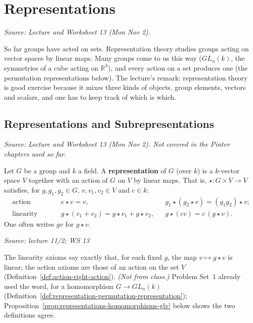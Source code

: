\documentclass[11pt]{report}
\newcommand{\srcline}[1]{\par\hfill{\footnotesize\textit{Source: #1}}}
\begin{document}
\chapter{Representations}\label{ch:representations}

\textit{Source: Lecture and Worksheet 13 (Mon Nov 2).}

So far groups have acted on sets. Representation theory studies groups acting on vector spaces by linear maps. Many groups come to us this way ($GL_n(k)$, the symmetries of a cube acting on $\mathbb{R}^3$), and every action on a set produces one (the permutation representations below). The lecture's remark: representation theory is good exercise because it mixes three kinds of objects, group elements, vectors and scalars, and one has to keep track of which is which.

\section{Representations and Subrepresentations}\label{sec:representations}

\textit{Source: Lecture and Worksheet 13 (Mon Nov 2). Not covered in the Pinter chapters used so far.}

\begin{defbox}[{Representation}]\label{def:representation}
Let $G$ be a group and $k$ a field. A \textbf{representation} of $G$ (over $k$) is a $k$-vector space $V$ together with an action of $G$ on $V$ by linear maps. That is, $\star: G \times V \to V$ satisfies, for $g, g_1, g_2 \in G$, $v, v_1, v_2 \in V$ and $c \in k$:
\begin{align*}
&\text{action axioms:} && e \star v = v, && g_1 \star (g_2 \star v) = (g_1g_2) \star v; \\
&\text{linearity axioms:} && g \star (v_1 + v_2) = g \star v_1 + g \star v_2, && g \star (cv) = c\,(g \star v).
\end{align*}
One often writes $gv$ for $g \star v$.
\srcline{lecture 11/2; WS 13}
\end{defbox}

The linearity axioms say exactly that, for each fixed $g$, the map $v \mapsto g \star v$ is linear; the action axioms are those of an action on the set $V$ (Definition~\ref{def:action-right-action}). \textit{(Not from class.)} Problem Set~1 already used the word, for a homomorphism $G \to GL_n(k)$ (Definition~\ref{def:representation-permutation-representation}); Proposition~\ref{prop:representations-homomorphisms-glv} below shows the two definitions agree.
\end{document}
